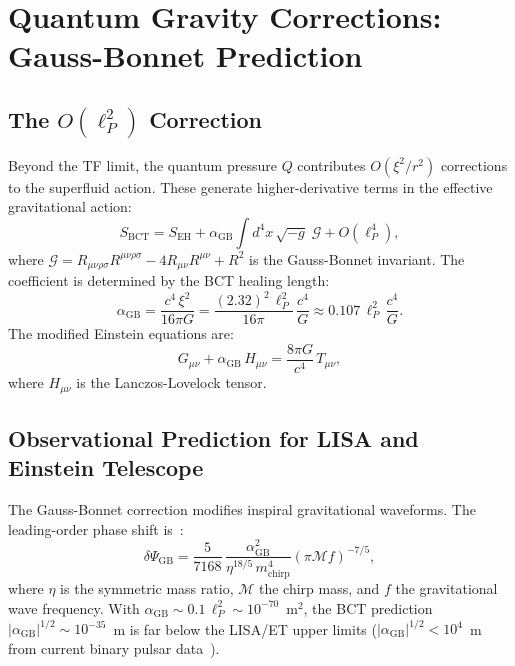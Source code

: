 \documentclass[11pt,a4paper]{article}
\theoremstyle{bctthm}
\theoremstyle{definition}
\begin{document}
\section{Quantum Gravity Corrections: Gauss-Bonnet Prediction}

\subsection{The $O(\ell_P^2)$ Correction}

Beyond the TF limit, the quantum pressure $Q$ contributes $O(\xi^2/r^2)$
corrections to the superfluid action. These generate higher-derivative terms
in the effective gravitational action:
\begin{equation}
S_\mathrm{BCT} = S_\mathrm{EH}
+ \alpha_\mathrm{GB}\int d^4x\,\sqrt{-g}\;
\mathcal{G} + O(\ell_P^4),
\label{eq:SGB}
\end{equation}
where $\mathcal{G} = R_{\mu\nu\rho\sigma}R^{\mu\nu\rho\sigma}
- 4R_{\mu\nu}R^{\mu\nu} + R^2$ is the Gauss-Bonnet invariant.
The coefficient is determined by the BCT healing length:
\begin{equation}
\alpha_\mathrm{GB} = \frac{c^4\,\xi^2}{16\pi G}
= \frac{(2.32)^2\,\ell_P^2}{16\pi}\,\frac{c^4}{G}
\approx 0.107\,\ell_P^2\,\frac{c^4}{G}.
\label{eq:aGB}
\end{equation}
The modified Einstein equations are:
\begin{equation}
G_{\mu\nu} + \alpha_\mathrm{GB}\,H_{\mu\nu}
= \frac{8\pi G}{c^4}\,T_{\mu\nu},
\label{eq:modEinstein}
\end{equation}
where $H_{\mu\nu}$ is the Lanczos-Lovelock tensor.

\subsection{Observational Prediction for LISA and Einstein Telescope}

The Gauss-Bonnet correction modifies inspiral gravitational waveforms.
The leading-order phase shift is~\cite{yunes2009}:
\begin{equation}
\delta\Psi_\mathrm{GB} = \frac{5}{7168}\,
\frac{\alpha_\mathrm{GB}^2}{\eta^{18/5}\,m_\mathrm{chirp}^4}
\left(\pi\mathcal{M}f\right)^{-7/5},
\label{eq:phasesh}
\end{equation}
where $\eta$ is the symmetric mass ratio, $\mathcal{M}$ the chirp mass,
and $f$ the gravitational wave frequency.
With $\alpha_\mathrm{GB} \sim 0.1\,\ell_P^2 \sim 10^{-70}$~m$^2$,
the BCT prediction $|\alpha_\mathrm{GB}|^{1/2} \sim 10^{-35}$~m is
far below the LISA/ET upper limits ($|\alpha_\mathrm{GB}|^{1/2} < 10^4$~m
from current binary pulsar data~\cite{amendola2007}).
\end{document}
